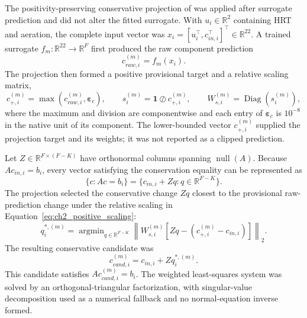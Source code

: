 \documentclass[12pt, twoside]{book}
\DeclareMathOperator*{\argmin}{argmin}
\begin{document}
The positivity-preserving conservative projection of \citet{KircherVotsmeier2025} was applied after surrogate
prediction and did not alter the fitted surrogate. With \(u_i\in\mathbb{R}^{2}\) containing HRT and aeration,
the complete input vector was \(x_i=[u_i^\top,c_{in,i}^\top]^\top\in\mathbb{R}^{22}\). A trained surrogate
\(f_m:\mathbb{R}^{22}\rightarrow\mathbb{R}^{F}\) first produced the raw component prediction
\begin{equation}
\label{eq:ch2_raw_prediction}
c_{raw,i}^{(m)}=f_m(x_i).
\end{equation}
The projection then formed a positive provisional target and a relative scaling matrix,
\begin{equation}
\label{eq:ch2_positive_scaling}
c_{+,i}^{(m)}=\max\!\left(c_{raw,i}^{(m)},\boldsymbol{\varepsilon}_c\right),\qquad
s_i^{(m)}=\mathbf{1}\oslash c_{+,i}^{(m)},\qquad
W_{s,i}^{(m)}=\operatorname{Diag}\!\left(s_i^{(m)}\right),
\end{equation}
where the maximum and division are componentwise and each entry of \(\boldsymbol{\varepsilon}_c\) is
\(10^{-8}\) in the native unit of its component. The lower-bounded vector \(c_{+,i}^{(m)}\) supplied the
projection target and its weights; it was not reported as a clipped prediction.

Let \(Z\in\mathbb{R}^{F\times(F-K)}\) have orthonormal columns spanning \(\operatorname{null}(A)\). Because
\(Ac_{in,i}=b_i\), every vector satisfying the conservation equality can be represented as
\begin{equation}
\label{eq:ch2_conservative_parameterization}
\{c:Ac=b_i\}=\{c_{in,i}+Zq:q\in\mathbb{R}^{F-K}\}.
\end{equation}
The projection selected the conservative change \(Zq\) closest to the provisional raw-prediction change under
the relative scaling in Equation~\eqref{eq:ch2_positive_scaling}:
\begin{equation}
\label{eq:ch2_scaled_projection}
q_i^{*,(m)}=\argmin_{q\in\mathbb{R}^{F-K}}
\left\|W_{s,i}^{(m)}\left[Zq-\left(c_{+,i}^{(m)}-c_{in,i}\right)\right]\right\|_2.
\end{equation}
The resulting conservative candidate was
\begin{equation}
\label{eq:ch2_conservative_candidate}
c_{cand,i}^{(m)}=c_{in,i}+Zq_i^{*,(m)}.
\end{equation}
This candidate satisfies \(Ac_{cand,i}^{(m)}=b_i\). The weighted least-squares system was solved by an
orthogonal-triangular factorization, with singular-value decomposition used as a numerical fallback and no
normal-equation inverse formed.
\end{document}
